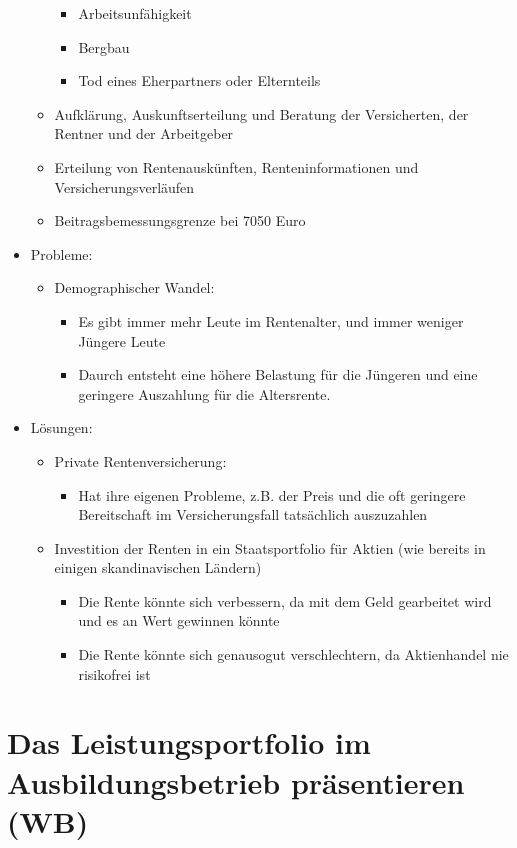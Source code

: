 \documentclass[a4paper, 12pt]{report}
\begin{document}
\begin{itemize}
\begin{itemize}
\begin{itemize}
		    \item Arbeitsunfähigkeit
		    \item Bergbau
		    \item Tod eines Eherpartners oder Elternteils
		\end{itemize}
	    \item Aufklärung, Auskunftserteilung und Beratung der Versicherten,
		der Rentner und der Arbeitgeber
	    \item Erteilung von Rentenauskünften, Renteninformationen und
		Versicherungsverläufen
	    \item Beitragsbemessungsgrenze bei 7050 Euro
	\end{itemize}
    \item Probleme:
	\begin{itemize}
	    \item Demographischer Wandel:
		\begin{itemize}
		    \item Es gibt immer mehr Leute im Rentenalter, und immer
			weniger Jüngere Leute
		    \item Daurch entsteht eine höhere Belastung für die Jüngeren
			und eine geringere Auszahlung für die Altersrente.
		\end{itemize}
	\end{itemize}
    \item Lösungen:
	\begin{itemize}
	    \item Private Rentenversicherung:
		\begin{itemize}
		    \item Hat ihre eigenen Probleme, z.B. der Preis und die oft
			geringere Bereitschaft im Versicherungsfall tatsächlich
			auszuzahlen
		\end{itemize}
	    \item Investition der Renten in ein Staatsportfolio für Aktien (wie
		bereits in einigen skandinavischen Ländern)
		\begin{itemize}
		    \item Die Rente könnte sich verbessern, da mit dem Geld
			gearbeitet wird und es an Wert gewinnen könnte
		    \item Die Rente könnte sich genausogut verschlechtern, da
			Aktienhandel nie risikofrei ist
		\end{itemize}
	\end{itemize}
\end{itemize}

\section{Das Leistungsportfolio im Ausbildungsbetrieb präsentieren (WB)}
\end{document}

